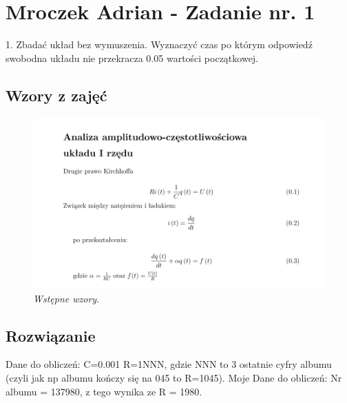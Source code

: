 \documentclass[12pt,oneside,a4paper]{book} %
\begin{document}
% 




\chapter{Mroczek Adrian - Zadanie nr. 1 }

1. Zbadać układ bez wymuszenia. Wyznaczyć czas po którym odpowiedź swobodna układu nie przekracza 0.05 wartości początkowej.
\section{Wzory z zajęć}




\begin{figure}[h]
\begin{center} 
\includegraphics[scale=0.7]{./images/wzorki_wstep.PNG} 
\caption{\textit{Wstępne wzory}.\newline }
\label{rys:logoup}
\end{center}
\end{figure}


\section{Rozwiązanie}
Dane do obliczeń:\newline
C=0.001
R=1NNN, gdzie NNN to 3 ostatnie cyfry albumu (czyli jak np albumu kończy się na 045 to R=1045).\newline
Moje Dane do obliczeń:\newline
Nr albumu = 137980, z tego wynika ze R = 1980.  
\end{document}
